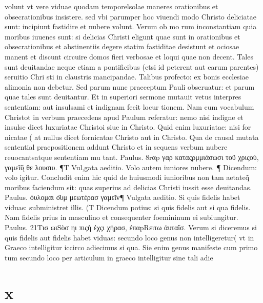 \documentclass{article}
\begin{document}
\begin{pages}
volunt vt vere viduae quodam temporelsolae maneres orationibus et obsecrationibus insistere. sed vbi parumper hoc viuendi modo Christo deliciatae sunt: incipiunt fastidire et nubere volunt. Verum ob mo rum inconstantiam quia moribus iuuenes sunt: si delicias Christi eligunt quae sunt in orationibus et obsecrationibus et abstinentiis degere statim fastiditae desistunt et ociosae manent et discunt circuire domos fieri verbosae et loqui quae non decent. Tales sunt deuitandae neque etiam a pontificibus (etsi id peterent aut earum parentes) seruitio Chri sti in claustris mancipandae. Talibus profecto: ex bonis ecclesiae alimonia non debetur. Sed parum nunc praeceptum Pauli obseruatur: et parum quae tales sunt deuitantur. Et in superiori sermone mutauit vetus interpres sententiam: aut insulsami et indignam fecit locur tionem. Nam cum vocabulum Christot in verbum praecedens apud Paulum referatur: nemo nisi indigne et insulse dicet luxuriatae Christoi siue in Christo. Quid enim luxuriatae: nisi for nicatae ( at nullus dicet fornicatae Christo aut in Christo. Qua de causal mutata sentential praepositionem addunt Christo et in sequens verbum nubere reuocantsatque sententiam mu tant. Paulus. 8rαp γαρ καταςρμμιάσωσι τοῦ χριςοὺ, γαμεῖῦͅ θε λουσιυ. ¶T Vul,gata aeditio. Volo autem iuniores nubere. ¶ Dicendum: volo igitur. Concludit enim hic quid de huiusmodi iunioribus non tam aetateq̃ moribus faciendum sit: quas superius ad delicias Christi iussit esse deuitandas. Paulus. όυλομαι ο͂υμ μεωτέρασ γαμεῖν¶ Vulgata aeditio. Si quis fidelis habet viduas: subministret illis. (T Dicendum potius: si quis fidelis aut si qua fidelis. Nam fidelis prius in masculino et consequenter foemininum ei subiungitur. Paulus. 21Tισ ωιSὸσ ηι πιςὴ ἐχςι χἠρασ, ἐπαpRειτω ἀυταῖσ. Verum si diceremus si quis fidelis aut fidelis habet viduas: secundo loco genus non intelligeretur( vt in Graeco intelligitur iccirco adiecimus si qua. Sie enim genus manifeste cum primo tum secundo loco per articulum in graeco intelligitur sine tali adie\pend
\section*{x }

\end{pages}
\end{document}
